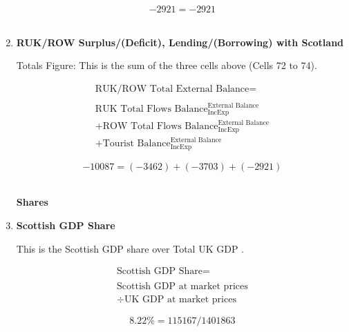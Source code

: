 \begin{enumerate}
\begin{equation} \nonumber
-2921 = -2921
\end{equation}\\


\newpage

\item \textbf {RUK/ROW Surplus/(Deficit), Lending/(Borrowing) with Scotland}

Totals Figure: This is the sum of the three cells above (Cells 72 to 74).

\begin{equation}
\begin{split}
\text{RUK/ROW Total External Balance} =  \\ \\
\text{RUK Total Flows Balance}^\text{External Balance}_\text{IncExp}\\
+\text{ROW Total Flows Balance}^\text{External Balance}_\text{IncExp}\\
+\text{Tourist Balance}^\text{External Balance}_\text{IncExp}
\end{split} \label{eq:2.5.79}
\end{equation}

\begin{equation} \nonumber
-10087 = (-3462)+(-3703)+(-2921)
\end{equation}\\

\newpage

\begin{center}
\textbf{\LARGE Shares}
\end{center}


\item \textbf {Scottish GDP Share}

This is the Scottish GDP share over Total UK GDP \cite{ScottishGovernment2013a, ONS2011c}.

\begin{equation}
\begin{split}
\text{Scottish GDP Share} =  \\ \\
\text{Scottish GDP at market prices}\\
\div \text{UK GDP at market prices}
\end{split} \label{eq:2.5.80}
\end{equation}

\begin{equation} \nonumber
8.22\% = 115167/1401863
\end{equation}\\


\end{enumerate}
